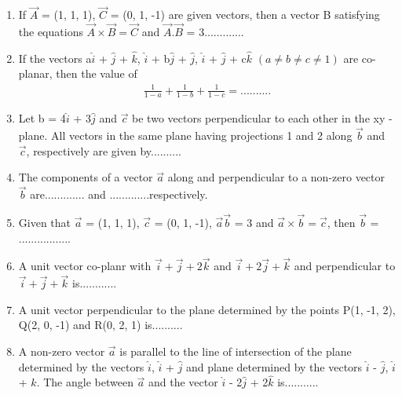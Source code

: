 \begin{enumerate}[label=\arabic*.,ref=\thesubsection.\theenumi]
\item If $\overrightarrow{A}$ = (1, 1, 1), $\overrightarrow{C}$ = (0, 1, -1) are given vectors, then a vector B satisfying the equations $\overrightarrow{A} \times \overrightarrow{B} = \overrightarrow{C}$ and 
$\overrightarrow{A} . \overrightarrow{B}$ = 3.............

\item If the vectors a$\hat{i}$ + $\hat{j}$ + $\hat{k}$, $\hat{i}$ + b$\hat{j}$ + $\hat{j}$, $\hat{i}$ + $\hat{j}$ + c$\hat{k}$ $(a \neq b \neq c \neq 1)$ are co-planar, then the value of 
\begin{align*}
\frac{1}{1 - a} + \frac{1}{1 - b} + \frac{1}{1 - c} = ..........
\end{align*}

\item Let b = 4$\hat{i}$ + 3$\hat{j}$ and $\overrightarrow{c}$ be two vectors perpendicular to each other in the xy - plane. All vectors in the same plane having projections 1 and 2 along $\overrightarrow{b}$ and $\overrightarrow{c}$, respectively are given by..........

\item The components of a vector $\overrightarrow{a}$ along and perpendicular to a non-zero vector 
$\overrightarrow{b}$ are............. and .............respectively.

\item Given that $\overrightarrow{a}$ = (1, 1, 1), $\overrightarrow{c}$ = (0, 1, -1), $\overrightarrow{a}\overrightarrow{b}$ = 3 and $\overrightarrow{a} \times \overrightarrow{b} = \overrightarrow{c}$, then $\overrightarrow{b}$ = .................

\item A unit vector co-planr with $\overrightarrow{i} + \overrightarrow{j} + 2\overrightarrow{k}$ and 
$\overrightarrow{i} + 2\overrightarrow{j} + \overrightarrow{k}$ and perpendicular to $\overrightarrow{i} + \overrightarrow{j} + \overrightarrow{k}$ is............

\item A unit vector perpendicular to the plane determined by the points P(1, -1, 2), Q(2, 0, -1) and R(0, 2, 1) is..........

\item A non-zero vector $\overrightarrow{a}$ is parallel to the line of intersection of the plane determined by the vectors $\hat{i}$, $\hat{i}$ + $\hat{j}$ and plane determined by the vectors $\hat{i}$ - $\hat{j}$, 
$\hat{i}$ + $\hat{k}$. The angle between $\overrightarrow{a}$ and the vector $\hat{i}$ - 2$\hat{j}$ + 2$\hat{k}$ is...........


\end{enumerate}
